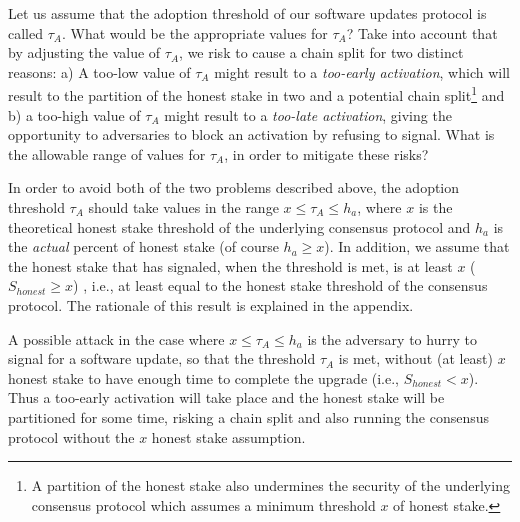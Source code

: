 Let us assume that the adoption threshold of our software updates protocol is called $\tau_A$. %
What would be the appropriate values for $\tau_A$? Take into account that by adjusting the value of $\tau_A$, we risk to cause a chain split for two distinct reasons: a) A too-low value of $\tau_A$ might result to a \emph{too-early activation}, which will result to the partition of the honest stake in two and a potential chain split\footnote{A partition of the honest stake also undermines the security of the underlying consensus protocol which assumes a minimum threshold $x$ of honest stake.}  and b) a too-high value of $\tau_A$ might result to a \emph{too-late activation}, giving the opportunity to adversaries to block an activation by refusing to signal. %
What is the allowable range of values for $\tau_A$, in order to mitigate these risks?

In order to avoid both of the two problems described above, the adoption threshold $\tau_A$ should take values in the range $x \leq \tau_A \leq h_a$, where $x$ is the theoretical honest stake threshold of the underlying consensus protocol and $h_a$ is the \emph{actual} percent of honest stake (of course $h_a \geq x$). In addition, we assume that the honest stake that has signaled, when the threshold is met, is at least $x$ ($S_{honest} \geq x$) , i.e., at least equal to the honest stake threshold of the consensus protocol. The rationale of this result is explained in the appendix.

A possible attack in the case where $x \leq \tau_A \leq h_a$ is the adversary to hurry to signal for a software update, so that the threshold $\tau_A$ is met, without (at least) $x$ honest stake to have enough time to complete the upgrade (i.e., $S_{honest} < x$). Thus a too-early activation will take place and the honest stake will be partitioned for some time, risking a chain split and also running the consensus protocol without the $x$ honest stake assumption.


